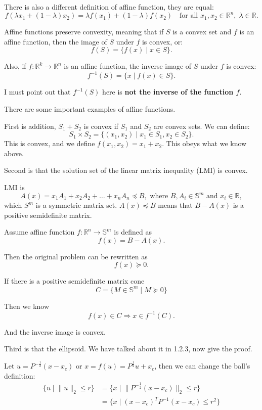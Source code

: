 \documentclass[lang=en,color=blue,mode=fancy,titlestyle=hang]{elegantbook}
\begin{document}
There is also a different definition of affine function, they are equal:
\[
f(\lambda x_1 + (1 - \lambda) x_2) = \lambda f(x_1) + (1 - \lambda) f(x_2) \quad \text{for all } x_1, x_2 \in \mathbb{R}^n, \; \lambda \in \mathbb{R}.
\]

Affine functions preserve convexity, meaning that if $S$ is a convex set and $f$ is an affine
function, then the image of $S$ under $f$ is convex, or:
\[
f(S) = \{f(x) \;|\; x \in S\}.
\]

Also, if $f: \mathbb{R}^k \rightarrow \mathbb{R}^n$ is an affine function, the inverse image
of $S$ under $f$ is convex:
\[
f^{-1}(S) = \{x \;|\; f(x) \in S\}.
\]

I must point out that $f^{-1}(S)$ here is \textbf{not the inverse of the function $f$}.

There are some important examples of affine functions.

First is addition, $S_1 + S_2$ is convex if $S_1$ and $S_2$ are convex sets. We can define:
\[
S_1 \times S_2 = \{(x_1, x_2) \;|\; x_1 \in S_1, x_2 \in S_2\}.
\]
This is convex, and we define $f(x_1, x_2) = x_1 + x_2$. This obeys what we know above.

Second is that the solution set of the linear matrix inequality (LMI) is convex.

LMI is
\[
A(x) = x_1A_1 + x_2A_2 + \ldots + x_nA_n \preceq B, \text{ where } B, A_i \in \mathbb{S}^m \text{ and } x_i \in \mathbb{R},
\]
which $S^m$ is a symmetric matrix set. $A(x) \preceq B$ means that $B - A(x)$ is a positive
semidefinite matrix.

Assume affine function $f: \mathbb{R}^n \rightarrow \mathbb{S}^m$ is defined as
\[
f(x) = B - A(x).
\]

Then the original problem can be rewritten as
\[
f(x) \succeq 0.
\]

If there is a positive semidefinite matrix cone
\[
C = \{M \in \mathbb{S}^m \;|\; M \succeq 0\}
\]

Then we know
\[
f(x) \in C \Rightarrow x \in f^{-1}(C).
\]

And the inverse image is convex.

Third is that the ellipsoid. We have talked about it in 1.2.3, now give the proof.

Let $u = P^{-\frac12}(x - x_c)$ or $x = f(u) = P^{\frac12}u + x_c$, then we can change
the ball's definition:
\begin{align*}
\{u \;|\; \|u\|_2 \leq r\} &= \{x \;|\;\|P^{-\frac12}(x - x_c)\|_2 \leq r\} \\
&= \{x \;|\; (x - x_c)^TP^{-1}(x - x_c) \leq r^2\}
\end{align*}
\end{document}

